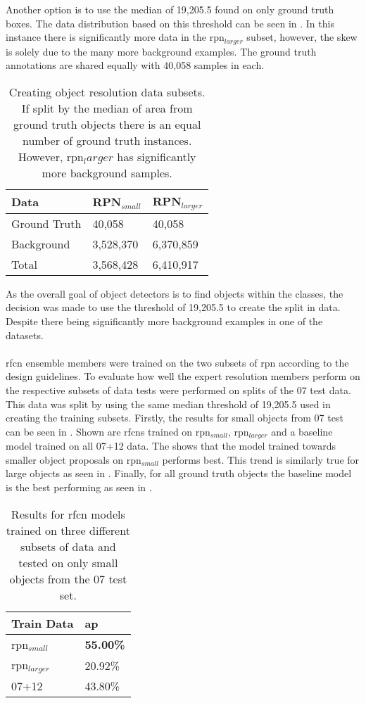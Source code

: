 \documentclass[a4paper,twoside]{article}
\begin{document}
Another option is to use the median of 19,205.5 found on only ground truth boxes. The data distribution based on this threshold can be seen in . In this instance there is significantly more data in the \gls{rpn}$_{larger}$ subset, however, the skew is solely due to the many more background examples. The ground truth annotations are shared equally with 40,058 samples in each.

\begin{table}[h]
\centering
\caption{Creating object resolution data subsets. If split by the median of area from ground truth objects there is an equal number of ground truth instances. However, \gls{rpn}$_larger$ has significantly more background samples.}
\label{tab:splitgt}
\begin{tabular}{|l|l|l|}
\hline
\textbf{Data} & \textbf{RPN$_{small}$} & \textbf{RPN$_{larger}$} \\ \hline
Ground Truth & 40,058    & 40,058     \\ 
Background   & 3,528,370 & 6,370,859  \\ \hline
Total        & 3,568,428 & 6,410,917  \\ \hline
\end{tabular}
\end{table}

As the overall goal of object detectors is to find objects within the classes, the decision was made to use the threshold of 19,205.5 to create the split in data. Despite there being significantly more background examples in one of the datasets. 
\\\\
\gls{rfcn} ensemble members were trained on the two subsets of \gls{rpn} according to the design guidelines. To evaluate how well the expert resolution members perform on the respective subsets of data tests were performed on splits of the 07 test data. This data was split by using the same median threshold of 19,205.5 used in creating the training subsets. Firstly, the results for small objects from 07 test can be seen in . Shown are \glspl{rfcn} trained on \gls{rpn}$_{small}$, \gls{rpn}$_{larger}$ and a baseline model trained on all 07+12 data. The shows that the model trained towards smaller object proposals on \gls{rpn}$_{small}$ performs best. This trend is similarly true for large objects as seen in . Finally, for all ground truth objects the baseline model is the best performing as seen in .


\begin{table}[h]
\centering
\caption{Results for \gls{rfcn} models trained on three different subsets of data and tested on only small objects from the 07 test set.}
\label{tab:small07res}
\begin{tabular}{|l|l|}
\hline
\textbf{Train Data} & \textbf{\gls{ap}}      \\ \hline
\gls{rpn}$_{small}$      & \textbf{55.00\%} \\ \hline
\gls{rpn}$_{larger}$      & 20.92\% \\ \hline
07+12        & 43.80\% \\ \hline
\end{tabular}
\end{table}
\end{document}
